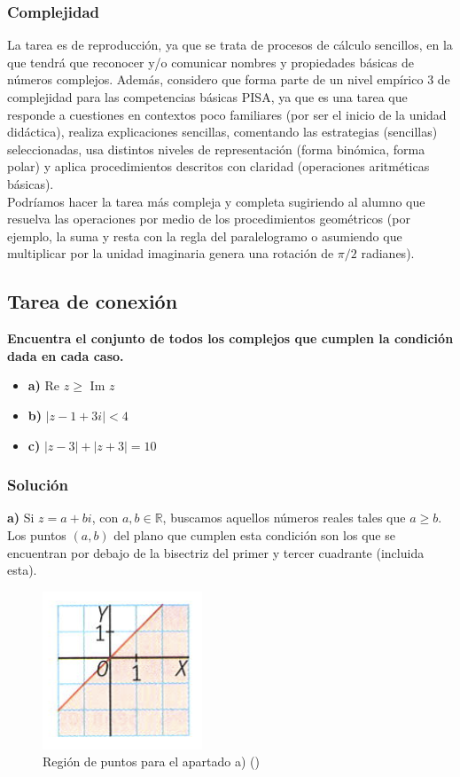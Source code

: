 \documentclass[../main.tex]{memoir}
\begin{document}
\subsubsection{Complejidad}
La tarea es de reproducción, ya que se trata de procesos de cálculo sencillos, en la que tendrá que reconocer y/o comunicar nombres y propiedades básicas de números complejos. Además, considero que forma parte de un nivel empírico 3 de complejidad para las competencias básicas PISA, ya que es una tarea que responde a cuestiones en contextos poco familiares (por ser el inicio de la unidad didáctica), realiza explicaciones sencillas, comentando las estrategias (sencillas) seleccionadas, usa distintos niveles de representación (forma binómica, forma polar) y aplica procedimientos descritos con claridad (operaciones aritméticas básicas). \\

Podríamos hacer la tarea más compleja y completa sugiriendo al alumno que resuelva las operaciones por medio de los procedimientos geométricos (por ejemplo, la suma y resta con la regla del paralelogramo o asumiendo que multiplicar por la unidad imaginaria genera una rotación de $\pi/2$ radianes).

\subsection{Tarea de conexión}

\textbf{Encuentra el conjunto de todos los complejos que cumplen la condición dada en cada caso.}

\begin{itemize}
	\item \textbf{a)} Re $z \geq$ Im $z$
	\item \textbf{b)} $|z-1+3i| < 4$
	\item \textbf{c)} $|z-3| + |z+3| = 10$
\end{itemize}

\subsubsection{Solución}

\textbf{a)} Si $z= a+bi$, con $a,b \in \mathbb{R}$, buscamos aquellos números reales tales que $a\geq b$. Los puntos $(a,b)$ del plano que cumplen esta condición son los que se encuentran por debajo de la bisectriz del primer y tercer cuadrante (incluida esta). 

\begin{figure}[H]
	\centering
	\includegraphics[scale=0.45]{images/region1.png}
	\caption{Región de puntos para el apartado a) (\cite{sm1bach})}
	\label{region1}
\end{figure}
\end{document}
